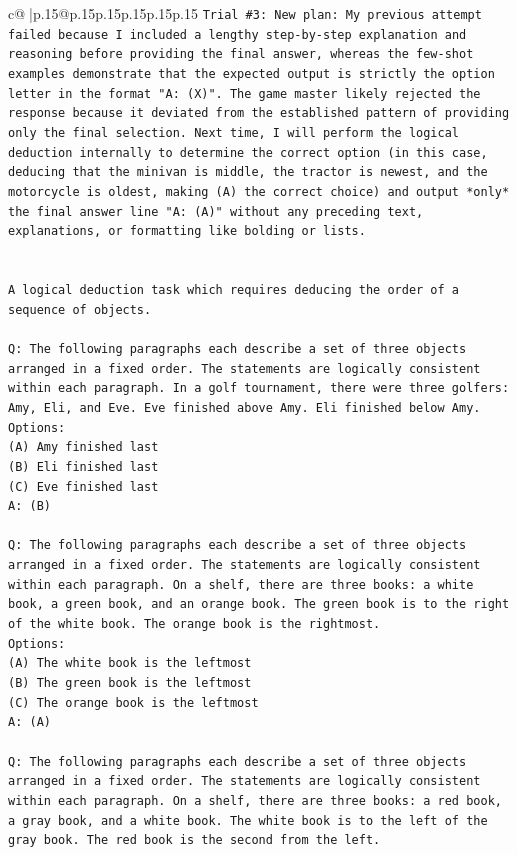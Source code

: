\documentclass{article}
\begin{document}
{\begin{supertabular}{c@{$\;$}|p{.15\linewidth}@{}p{.15\linewidth}p{.15\linewidth}p{.15\linewidth}p{.15\linewidth}p{.15\linewidth}}
{{{\texttt{Trial \#3: New plan: My previous attempt failed because I included a lengthy step{-}by{-}step explanation and reasoning before providing the final answer, whereas the few{-}shot examples demonstrate that the expected output is strictly the option letter in the format "A: (X)". The game master likely rejected the response because it deviated from the established pattern of providing only the final selection. Next time, I will perform the logical deduction internally to determine the correct option (in this case, deducing that the minivan is middle, the tractor is newest, and the motorcycle is oldest, making (A) the correct choice) and output *only* the final answer line "A: (A)" without any preceding text, explanations, or formatting like bolding or lists.} \\
\\ 
\\ 
\texttt{A logical deduction task which requires deducing the order of a sequence of objects.} \\
\\ 
\texttt{Q: The following paragraphs each describe a set of three objects arranged in a fixed order. The statements are logically consistent within each paragraph. In a golf tournament, there were three golfers: Amy, Eli, and Eve. Eve finished above Amy. Eli finished below Amy.} \\
\texttt{Options:} \\
\texttt{(A) Amy finished last} \\
\texttt{(B) Eli finished last} \\
\texttt{(C) Eve finished last} \\
\texttt{A: (B)} \\
\\ 
\texttt{Q: The following paragraphs each describe a set of three objects arranged in a fixed order. The statements are logically consistent within each paragraph. On a shelf, there are three books: a white book, a green book, and an orange book. The green book is to the right of the white book. The orange book is the rightmost.} \\
\texttt{Options:} \\
\texttt{(A) The white book is the leftmost} \\
\texttt{(B) The green book is the leftmost} \\
\texttt{(C) The orange book is the leftmost} \\
\texttt{A: (A)} \\
\\ 
\texttt{Q: The following paragraphs each describe a set of three objects arranged in a fixed order. The statements are logically consistent within each paragraph. On a shelf, there are three books: a red book, a gray book, and a white book. The white book is to the left of the gray book. The red book is the second from the left.} \\
}}}
\end{supertabular}}
\end{document}
